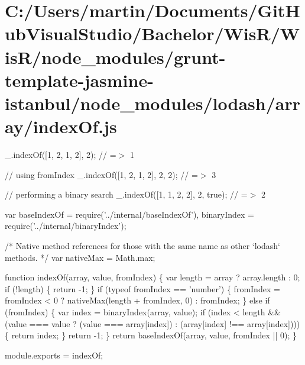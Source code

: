 \hypertarget{_c_1_2_users_2martin_2_documents_2_git_hub_visual_studio_2_bachelor_2_wis_r_2_wis_r_2node_module54c7d9ba4ee9752b07652d7968c87e3d}{}\section{C\+:/\+Users/martin/\+Documents/\+Git\+Hub\+Visual\+Studio/\+Bachelor/\+Wis\+R/\+Wis\+R/node\+\_\+modules/grunt-\/template-\/jasmine-\/istanbul/node\+\_\+modules/lodash/array/index\+Of.\+js}
\+\_\+.\+index\+Of(\mbox{[}1, 2, 1, 2\mbox{]}, 2); // =$>$ 1

// using {\ttfamily from\+Index} \+\_\+.\+index\+Of(\mbox{[}1, 2, 1, 2\mbox{]}, 2, 2); // =$>$ 3

// performing a binary search \+\_\+.\+index\+Of(\mbox{[}1, 1, 2, 2\mbox{]}, 2, true); // =$>$ 2


\begin{DoxyCodeInclude}
var baseIndexOf = require(\textcolor{stringliteral}{'../internal/baseIndexOf'}),
    binaryIndex = require(\textcolor{stringliteral}{'../internal/binaryIndex'});

\textcolor{comment}{/* Native method references for those with the same name as other `lodash` methods. */}
var nativeMax = Math.max;

\textcolor{keyword}{function} indexOf(array, value, fromIndex) \{
  var length = array ? array.length : 0;
  \textcolor{keywordflow}{if} (!length) \{
    \textcolor{keywordflow}{return} -1;
  \}
  \textcolor{keywordflow}{if} (typeof fromIndex == \textcolor{stringliteral}{'number'}) \{
    fromIndex = fromIndex < 0 ? nativeMax(length + fromIndex, 0) : fromIndex;
  \} \textcolor{keywordflow}{else} \textcolor{keywordflow}{if} (fromIndex) \{
    var index = binaryIndex(array, value);
    \textcolor{keywordflow}{if} (index < length &&
        (value === value ? (value === array[index]) : (array[index] !== array[index]))) \{
      \textcolor{keywordflow}{return} index;
    \}
    \textcolor{keywordflow}{return} -1;
  \}
  \textcolor{keywordflow}{return} baseIndexOf(array, value, fromIndex || 0);
\}

module.exports = indexOf;
\end{DoxyCodeInclude}
 